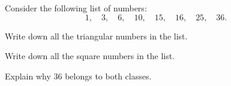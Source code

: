  Consider the following list of numbers:
\[
1,\quad 3,\quad 6,\quad 10,\quad 15,\quad 16,\quad 25,\quad 36.
\]
\begin{subparts}
  \item Write down all the triangular numbers in the list.
  \item Write down all the square numbers in the list.
  \item Explain why $36$ belongs to both classes.
\end{subparts}
